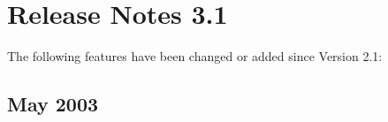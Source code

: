 \section{Release Notes 3.1}
\label{sec:releasenotes-3-1}
The following features have been changed or added since Version 2.1:\\

\subsection{May 2003}
